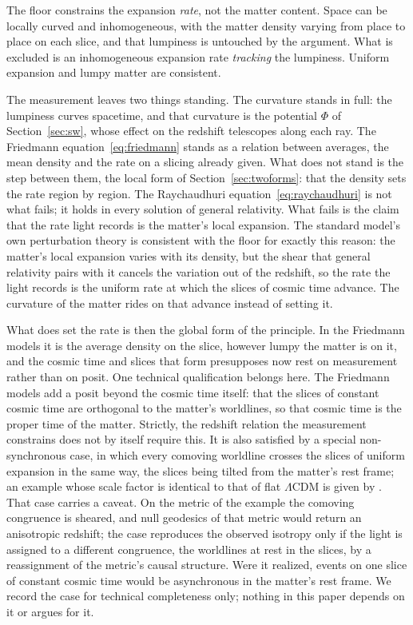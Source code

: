 \documentclass[twocolumn]{aastex701}
\begin{document}
The floor constrains the expansion \emph{rate}, not the matter content. Space can be locally curved and inhomogeneous, with the matter density varying from place to place on each slice, and that lumpiness is untouched by the argument. What is excluded is an inhomogeneous expansion rate \emph{tracking} the lumpiness. Uniform expansion and lumpy matter are consistent.

The measurement leaves two things standing. The curvature stands in full: the lumpiness curves spacetime, and that curvature is the potential $\Phi$ of Section~\ref{sec:sw}, whose effect on the redshift telescopes along each ray. The Friedmann equation~\eqref{eq:friedmann} stands as a relation between averages, the mean density and the rate on a slicing already given. What does not stand is the step between them, the local form of Section~\ref{sec:twoforms}: that the density sets the rate region by region. The Raychaudhuri equation~\eqref{eq:raychaudhuri} is not what fails; it holds in every solution of general relativity. What fails is the claim that the rate light records is the matter's local expansion. The standard model's own perturbation theory is consistent with the floor for exactly this reason: the matter's local expansion varies with its density, but the shear that general relativity pairs with it cancels the variation out of the redshift, so the rate the light records is the uniform rate at which the slices of cosmic time advance. The curvature of the matter rides on that advance instead of setting it.

What does set the rate is then the global form of the principle. In the Friedmann models it is the average density on the slice, however lumpy the matter is on it, and the cosmic time and slices that form presupposes now rest on measurement rather than on posit. One technical qualification belongs here. The Friedmann models add a posit beyond the cosmic time itself: that the slices of constant cosmic time are orthogonal to the matter's worldlines, so that cosmic time is the proper time of the matter. Strictly, the redshift relation the measurement constrains does not by itself require this. It is also satisfied by a special non-synchronous case, in which every comoving worldline crosses the slices of uniform expansion in the same way, the slices being tilted from the matter's rest frame; an example whose scale factor is identical to that of flat $\Lambda$CDM is given by \citet{Janzen2015}. That case carries a caveat. On the metric of the example the comoving congruence is sheared, and null geodesics of that metric would return an anisotropic redshift; the case reproduces the observed isotropy only if the light is assigned to a different congruence, the worldlines at rest in the slices, by a reassignment of the metric's causal structure. Were it realized, events on one slice of constant cosmic time would be asynchronous in the matter's rest frame. We record the case for technical completeness only; nothing in this paper depends on it or argues for it.
\end{document}
